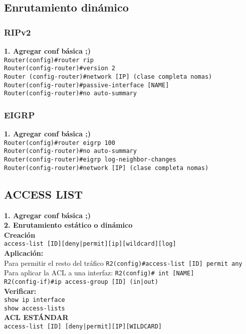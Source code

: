 \documentclass[letterpaper,12pt]{article}
\begin{document}
\begin{sloppypar}
\subsection{Enrutamiento dinámico}
\subsubsection{RIPv2}
\textbf{1. Agregar conf básica ;)} \\  
\texttt{Router(config)\#router rip \\ Router(config-router)\#version 2 \\ Router (config-router)\#network [IP] (clase completa nomas) \\ Router(config-router)\#passive-interface [NAME] \\ Router(config-router)\#no auto-summary}
\subsubsection{EIGRP}
\textbf{1. Agregar conf básica ;)} \\  
\texttt{Router(config)\#router eigrp 100 \\ Router(config-router)\#no auto-summary\\ Router(config-router)\#eigrp log-neighbor-changes\\ Router(config-router)\#network [IP] (clase completa nomas)}
\newpage
\subsection{ACCESS LIST}
\textbf{1. Agregar conf básica ;)} \\ 
\textbf{2. Enrutamiento estático o dinámico}\\
\textbf{Creación} \\
\texttt{access-list [ID][deny|permit][ip][wildcard][log]}
\vspace{0.3cm}\\ 
\textbf{Aplicación:}\\ 
Para permitir el resto del tráfico
\texttt{R2(config)\#access-list [ID] permit any}\\ 
Para aplicar la ACL a una interfaz:
\texttt{R2(config)\# int [NAME] \\ R2(config-if)\#ip access-group [ID] (in|out)}
\vspace{0.3cm}\\ 
\textbf{Verificar:}\\ 
\texttt{show ip interface \\ show access-lists}
\vspace{0.3cm}\\ 
\textbf{ACL ESTÁNDAR}\\
\texttt{access-list [ID] [deny|permit][IP][WILDCARD]}


\end{sloppypar}
\end{document}
